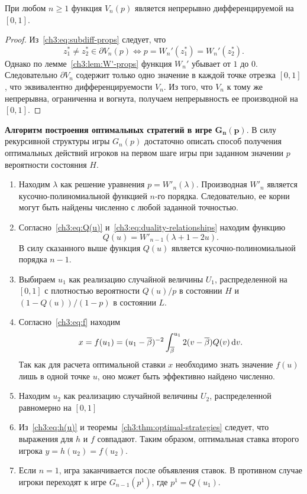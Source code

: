 {\begin{proposition}
  При любом $n \geqslant 1$ функция $V_n(p)$ является непрерывно дифференцируемой на $[0, 1]$.
\end{proposition}
\begin{proof}
  Из~\eqref{ch3:eq:subdiff-props} следует, что
  \begin{equation*}
    z_1^* \neq z_2^* \in \partial V_n(p) \iff p = W_n'(z_1^*) = W_n'(z_2^*).
  \end{equation*}
  Однако по лемме~\ref{ch3:lem:W'-props} функция $W_n'$ убывает от $1$ до $0$.
  Следовательно $\partial V_n$ содержит только одно значение в каждой точке отрезка $[0, 1]$, что эквивалентно дифференцируемости $V_n$.
  Из того, что $V_n$ к тому же непрерывна, ограниченна и вогнута, получаем непрерывность ее производной на $[0, 1]$.
\end{proof}

\noindent
\textbf{Алгоритм построения оптимальных стратегий в игре $\mathbf{G_n(p)}$}.
В силу рекурсивной структуры игры $G_n(p)$ достаточно описать способ получения оптимальных действий игроков на первом шаге игры при заданном значении $p$ вероятности состояния $H$.
\begin{enumerate}
\item
  Находим $\lambda$ как решение уравнения 
  $
    p = W'_n(\lambda).
  $
  Производная $W'_n$ является кусочно-полиномиальной функцией $n$-го порядка.
  Следовательно, ее корни могут быть найдены численно с любой заданной точностью.
\item
  Согласно~\eqref{ch3:eq:Q(u)} и~\eqref{ch3:eq:duality-relationships} находим функцию 
  \[
    Q(u) = W'_{n-1}(\lambda + 1 - 2u).
  \]
  В силу сказанного выше функция $Q(u)$ является кусочно-полиномиальной порядка $n-1$.
\item
  Выбираем $u_1$ как реализацию случайной величины $U_1$, распределенной на $[0, 1]$ с плотностью вероятности $Q(u)/p$ в состоянии $H$ и $\left(1 - Q(u)\right)/(1-p)$ в состоянии $L$.
\item
  Согласно~\eqref{ch3:eq:f} находим 
  \[
    x = f(u_1) = (u_1 - {{\overline{\beta}}})^{-2} \int_{{{\overline{\beta}}}}^{u_1} 2 (v - {{\overline{\beta}}}) Q(v) \mathop{}\!\mathrm{d} v.
  \]
  Так как для расчета оптимальной ставки $x$ необходимо знать значение $f(u)$ лишь в одной точке $u$, оно может быть эффективно найдено численно.
\item
  Находим $u_2$ как реализацию случайной величины $U_2$, распределенной равномерно на $[0, 1]$
\item
  Из~\eqref{ch3:eq:h(u)} и теоремы~\ref{ch3:thm:optimal-strategies} следует, что выражения для $h$ и $f$ совпадают.
  Таким образом, оптимальная ставка второго игрока $y = h(u_2) = f(u_2)$.
\item
  Если $n = 1$, игра заканчивается после объявления ставок. В противном случае игроки переходят к игре $G_{n-1}(p^1)$, где $p^1 = Q(u_1)$.
\end{enumerate}

}
